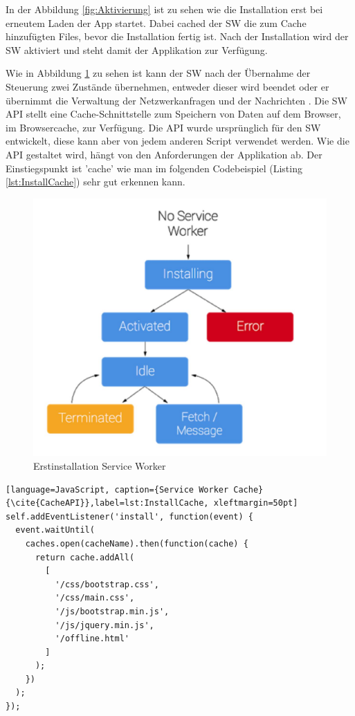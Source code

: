 In der Abbildung \ref{fig:Aktivierung} ist zu sehen wie die Installation erst bei erneutem Laden der App startet. Dabei cached der \acs{SW} die zum Cache hinzufügten Files, bevor die Installation fertig ist.
Nach der Installation wird der \acs{SW} aktiviert und steht damit der Applikation zur Verfügung.


Wie in Abbildung \ref{fig:Erstinstallation} zu sehen ist kann der \acs{SW} nach der Übernahme der Steuerung zwei Zustände übernehmen, entweder dieser wird beendet oder er übernimmt die Verwaltung der Netzwerkanfragen und der Nachrichten \cite{ServiceWorkerRegistration}.
Die \acs{SW} API stellt eine Cache-Schnittstelle zum Speichern von Daten auf dem Browser, im Browsercache, zur Verfügung. Die API wurde ursprünglich für den \acs{SW} entwickelt, diese kann aber von jedem anderen Script verwendet werden. 
Wie die API gestaltet wird, hängt von den Anforderungen der Applikation ab.
Der Einstiegspunkt ist 'cache' wie man im folgenden Codebeispiel (Listing \ref{lst:InstallCache}) sehr gut erkennen kann.

\begin{figure}[h]
	\centering
	\includegraphics[width=14cm]{BilderAllgemein/InstallSW}\medskip
	\caption{Erstinstallation Service Worker \cite{ServiceWorkerRegistration}}
	\label{fig:Erstinstallation}
\end{figure}

\newpage
\begin{lstlisting}[language=JavaScript, caption={Service Worker Cache} {\cite{CacheAPI}},label=lst:InstallCache, xleftmargin=50pt]
self.addEventListener('install', function(event) {
  event.waitUntil(
    caches.open(cacheName).then(function(cache) {
      return cache.addAll(
        [
          '/css/bootstrap.css',
          '/css/main.css',
          '/js/bootstrap.min.js',
          '/js/jquery.min.js',
          '/offline.html'
        ]
      );
    })
  );
});
\end{lstlisting}

